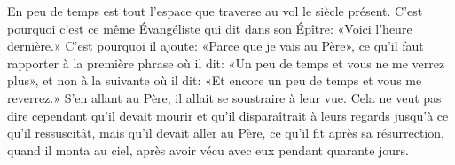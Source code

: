 En peu de temps est tout l’espace que traverse au vol le siècle présent.
C’est pourquoi c’est ce même Évangéliste qui dit dans son Épître:
	«Voici l’heure dernière.»
C’est pourquoi il ajoute: «Parce que je vais au Père»,
	ce qu’il faut rapporter à la première phrase où il dit:
	«Un peu de temps et vous ne me verrez plus»,
	et non à la suivante où il dit:
		«Et encore un peu de temps et vous me reverrez.»
S’en allant au Père, il allait se soustraire à leur vue.
Cela ne veut pas dire cependant qu’il devait mourir
	et qu’il disparaîtrait à leurs regards jusqu’à ce qu’il ressuscitât,
	mais qu’il devait aller au Père,
	ce qu’il fit après sa résurrection, quand il monta au ciel,
	après avoir vécu avec eux pendant quarante jours.
